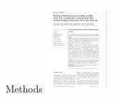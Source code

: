 \documentclass[aspectratio=169]{beamer}
\newcommand{\smallpaperwidth}{0.175}
\begin{document}
\begin{frame}{Methods}
{		\includegraphics[width=\smallpaperwidth\textwidth]{wennike03}
	}

	

\end{frame}
\end{document}
